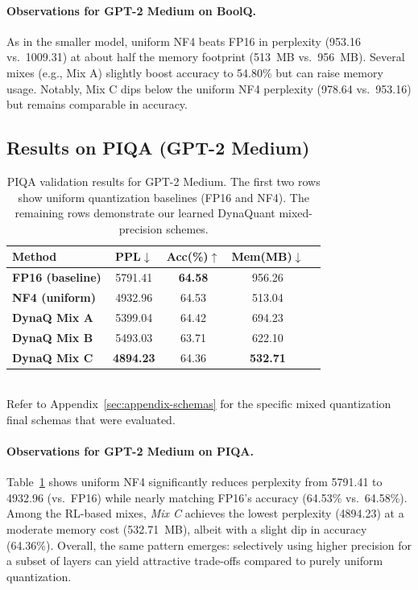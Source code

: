 \documentclass{article}
\begin{document}
	\paragraph{Observations for GPT-2 Medium on BoolQ.}
	As in the smaller model, uniform NF4 beats FP16 in perplexity (953.16 vs.\ 1009.31) at about half the memory footprint (513~MB vs.\ 956~MB). Several mixes (e.g., Mix A) slightly boost accuracy to 54.80\% but can raise memory usage. Notably, Mix C dips below the uniform NF4 perplexity (978.64 vs.\ 953.16) but remains comparable in accuracy.
	
	\subsection{Results on PIQA (GPT-2 Medium)}
		
	\begin{table}[ht]
		\centering
		\label{tab:piqa-medium}
		\begin{tabular}{lcccc}
			\toprule
			\textbf{Method} & \textbf{PPL}$\downarrow$ & \textbf{Acc(\%)}$\uparrow$ & \textbf{Mem(MB)}$\downarrow$ \\
			\midrule
			\textbf{FP16 (baseline)} & 5791.41 & \textbf{64.58} & 956.26 \\
			\textbf{NF4 (uniform)}   & 4932.96 & 64.53 & 513.04 \\
			\midrule
			\textbf{DynaQ Mix A}     & 5399.04 & 64.42 & 694.23 \\
			\textbf{DynaQ Mix B}     & 5493.03 & 63.71 & 622.10 \\
			\textbf{DynaQ Mix C}     & \textbf{4894.23} & 64.36 & \textbf{532.71} \\
			\bottomrule
		\end{tabular}
		\caption{\small PIQA validation results for GPT-2 Medium. The first two rows show uniform quantization baselines (FP16 and NF4). The remaining rows demonstrate our learned DynaQuant mixed-precision schemes.}
	\end{table}
	
	
	\textbf{}
	\\
	\small{Refer to Appendix~\ref{sec:appendix-schemas} for the specific mixed quantization final schemas that were evaluated.}
	
	\paragraph{Observations for GPT-2 Medium on PIQA.}
	Table~\ref{tab:piqa-medium} shows uniform NF4 significantly reduces perplexity from 5791.41 to 4932.96 (vs.\ FP16) while nearly matching FP16's accuracy (64.53\% vs.\ 64.58\%). Among the RL-based mixes, \emph{Mix C} achieves the lowest perplexity (4894.23) at a moderate memory cost (532.71~MB), albeit with a slight dip in accuracy (64.36\%). Overall, the same pattern emerges: selectively using higher precision for a subset of layers can yield attractive trade-offs compared to purely uniform quantization.
	
\end{document}
